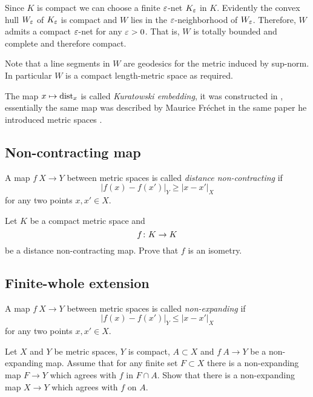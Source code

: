Since $K$ is compact we can choose a finite $\varepsilon$-net $K_\varepsilon$ in $K$.
Evidently the convex hull $W_\varepsilon$ of $K_\varepsilon$ is compact and $W$ lies in the $\varepsilon$-neighborhood of $W_\varepsilon$.
Therefore, $W$ admits a compact $\varepsilon$-net for any $\varepsilon>0$.
That is, $W$ is totally bounded and complete and therefore compact.

Note that a line segments in $W$ are geodesics for the metric induced by sup-norm. 
In particular $W$ is a compact length-metric space as required.
\qeds

The map $x\mapsto \operatorname{\rm dist}\nolimits_x$ is called \emph{Kuratowski embedding},
it was constructed in \cite{kuratowski},
essentially the same map 
was described by Maurice Fr\'echet 
in the same paper he introduced metric spaces \cite[see][]{frechet}.


\subsection*{Non-contracting map\easy}
\label{Noncontracting map}

A map $f\: X\to Y$ between metric spaces is called \emph{distance non-contracting} if
\[|f(x)-f(x')|_Y\ge |x-x'|_X\]
for any two points $x,x'\in X$.

\begin{pr}
Let $K$  be a compact metric space and
\[f\:K\z\to K\] 
be a distance non-contracting map.
Prove that $f$ is an isometry.
\end{pr}

\subsection*{Finite-whole extension}
\label{Finite-whole extension}

A map $f\: X\to Y$ between metric spaces is called \emph{non-expanding} if
\[|f(x)-f(x')|_Y\le |x-x'|_X\]
for any two points $x,x'\in X$.

\begin{pr}
Let $X$ and $Y$ be metric spaces, 
$Y$ is compact,
$A\subset X$ and $f\:A\to Y$ be a non-expanding map.
Assume that for any finite set $F\subset X$ there is a non-expanding map $F \to Y$
which agrees with $f$ in $F\cap A$.
Show that there is a non-expanding map $X\to  Y$ which agrees with $f$ on $A$.
\end{pr}


